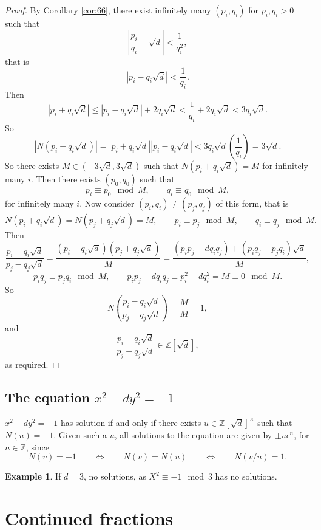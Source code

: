 \documentclass{article}
\newcommand{\Z}{\mathbb{Z}}
\newcommand{\rb}[1]{\left( #1 \right)}
\renewcommand{\sb}[1]{\left[ #1 \right]}
\newcommand{\abs}[1]{\left\lvert #1 \right\rvert}
\theoremstyle{definition}\newtheorem{definition}{Definition}
\theoremstyle{definition}\newtheorem{remark}[definition]{Remark}
\theoremstyle{definition}\newtheorem*{example}{Example}
\theoremstyle{definition}\newtheorem*{note}{Note}
\begin{document}
\begin{proof}
By Corollary \ref{cor:66}, there exist infinitely many $ \rb{p_i, q_i} $ for $ p_i, q_i > 0 $ such that
$$ \abs{\dfrac{p_i}{q_i} - \sqrt{d}} < \dfrac{1}{q_i^2}, $$
that is
$$ \abs{p_i - q_i\sqrt{d}} < \dfrac{1}{q_i}. $$
Then
$$ \abs{p_i + q_i\sqrt{d}} \le \abs{p_i - q_i\sqrt{d}} + 2q_i\sqrt{d} < \dfrac{1}{q_i} + 2q_i\sqrt{d} < 3q_i\sqrt{d}. $$
So
$$ \abs{N\rb{p_i + q_i\sqrt{d}}} = \abs{p_i + q_i\sqrt{d}}\abs{p_i - q_i\sqrt{d}} < 3q_i\sqrt{d}\rb{\dfrac{1}{q_i}} = 3\sqrt{d}. $$
So there exists $ M \in \rb{-3\sqrt{d}, 3\sqrt{d}} $ such that $ N\rb{p_i + q_i\sqrt{d}} = M $ for infinitely many $ i $. Then there exists $ \rb{p_0, q_0} $ such that
$$ p_i \equiv p_0 \mod M, \qquad q_i \equiv q_0 \mod M, $$
for infinitely many $ i $. Now consider $ \rb{p_i, q_i} \ne \rb{p_j, q_j} $ of this form, that is
$$ N\rb{p_i + q_i\sqrt{d}} = N\rb{p_j + q_j\sqrt{d}} = M, \qquad p_i \equiv p_j \mod M, \qquad q_i \equiv q_j \mod M. $$
Then
$$ \dfrac{p_i - q_i\sqrt{d}}{p_j - q_j\sqrt{d}} = \dfrac{\rb{p_i - q_i\sqrt{d}}\rb{p_j + q_j\sqrt{d}}}{M} = \dfrac{\rb{p_ip_j - dq_iq_j} + \rb{p_iq_j - p_jq_i}\sqrt{d}}{M}, $$
$$ p_iq_j \equiv p_jq_i \mod M, \qquad p_ip_j - dq_iq_j \equiv p_i^2 - dq_i^2 = M \equiv 0 \mod M. $$
So
$$ N\rb{\dfrac{p_i - q_i\sqrt{d}}{p_j - q_j\sqrt{d}}} = \dfrac{M}{M} = 1, $$
and
$$ \dfrac{p_i - q_i\sqrt{d}}{p_j - q_j\sqrt{d}} \in \Z\sb{\sqrt{d}}, $$
as required.
\end{proof}


\subsection{The equation $ x^2 - dy^2 = - 1 $}

$ x^2 - dy^2 = -1 $ has solution if and only if there exists $ u \in \Z\sb{\sqrt{d}}^\times $ such that $ N\rb{u} = -1 $. Given such a $ u $, all solutions to the equation are given by $ \pm u\epsilon^n $, for $ n \in \Z $, since
$$ N\rb{v} = -1 \qquad \iff \qquad N\rb{v} = N\rb{u} \qquad \iff \qquad N\rb{v / u} = 1. $$

\begin{example}
If $ d = 3 $, no solutions, as $ X^2 \equiv -1 \mod 3 $ has no solutions.
\end{example}

\pagebreak

\section{Continued fractions}
\end{document}
